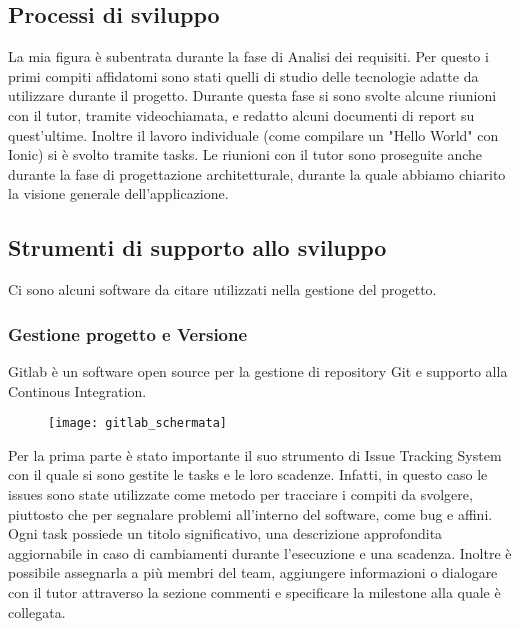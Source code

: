 \subsection{Processi di sviluppo}
La mia figura è subentrata durante la fase di Analisi dei requisiti. Per questo i primi compiti affidatomi sono stati quelli di studio delle tecnologie adatte da utilizzare durante il progetto. Durante questa fase si sono svolte alcune riunioni con il tutor, tramite videochiamata, e redatto alcuni documenti di report su quest'ultime. Inoltre il lavoro individuale (come compilare un "Hello World" con Ionic) si è svolto tramite tasks. Le riunioni con il tutor sono proseguite anche durante la fase di progettazione architetturale, durante la quale abbiamo chiarito la visione generale dell'applicazione.

\subsection{Strumenti di supporto allo sviluppo}
Ci sono alcuni software da citare utilizzati nella gestione del progetto.

\subsubsection{Gestione progetto e Versione}
Gitlab è un software open source per la gestione di repository \gls{Git} e supporto alla Continous Integration.

\begin{figure}[htbp]
\begin{center}
\texttt{[image: gitlab\_schermata]}
\end{center}
\end{figure}

\noindent Per la prima parte è stato importante il suo strumento di \gls{Issue Tracking System} con il quale si sono gestite le tasks e le loro scadenze.
Infatti, in questo caso le issues sono state utilizzate come metodo per tracciare i compiti da svolgere, piuttosto che per segnalare problemi all'interno del software, come bug e affini. \\
\noindent Ogni task possiede un titolo significativo, una descrizione approfondita aggiornabile in caso di cambiamenti durante l'esecuzione e una scadenza. Inoltre è possibile assegnarla a più membri del team, aggiungere informazioni o dialogare con il tutor attraverso la sezione commenti e specificare la milestone alla quale è collegata.

